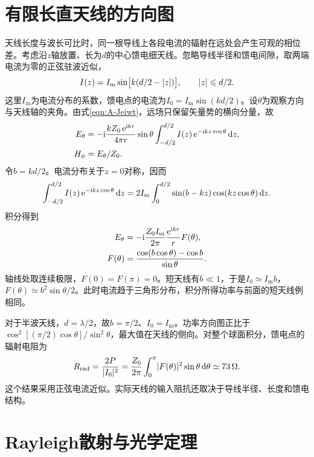 \section{有限长直天线的方向图}

天线长度与波长可比时，同一根导线上各段电流的辐射在远处会产生可观的相位差。考虑沿$z$轴放置、长为$d$的中心馈电细天线。忽略导线半径和馈电间隙，取两端电流为零的正弦驻波近似，
\[
    I(z) = I_{\mathrm{m}}\sin\bigl[k(d/2 - \lvert z\rvert)\bigr],\qquad
    \lvert z\rvert \leqslant d/2.
\]
这里$I_{\mathrm{m}}$为电流分布的系数，馈电点的电流为$I_0 = I_{\mathrm{m}}\sin(kd/2)$。设$\theta$为观察方向与天线轴的夹角。由式\eqref{eqn:A-Jeiwt}，远场只保留矢量势的横向分量，故
\begin{align*}
    E_\theta &= -\mathrm{i}\frac{kZ_0\mathop{}\!\mathrm{e}^{\mathrm{i} kr}}{4\pi r}\sin\theta
       \int_{-d/2}^{d/2} I(z)\mathop{}\!\mathrm{e}^{-\mathrm{i} kz\cos\theta}\mathop{}\!\mathrm{d} z,\\
    H_\phi &= E_\theta/Z_0.
\end{align*}
令$b = kd/2$。电流分布关于$z = 0$对称，因而
\[
    \int_{-d/2}^{d/2}I(z)\mathop{}\!\mathrm{e}^{-\mathrm{i} kz\cos\theta}\mathop{}\!\mathrm{d} z = 2I_{\mathrm{m}}\int_0^{d/2}\sin(b - kz)\cos(kz\cos\theta)\mathop{}\!\mathrm{d} z.
\]
积分得到
\begin{subequations}
    \begin{align}
        E_\theta &= -\mathrm{i}\frac{Z_0 I_{\mathrm{m}}}{2\pi}\frac{\mathop{}\!\mathrm{e}^{\mathrm{i} kr}}r F(\theta),\\
        F(\theta) &= \frac{\cos(b\cos\theta) - \cos b}{\sin\theta}.
    \end{align}
\end{subequations}
轴线处取连续极限，$F(0) = F(\pi) = 0$。短天线有$b \ll 1$，于是$I_0 \simeq I_{\mathrm{m}} b$，$F(\theta) \simeq b^2\sin\theta/2$。此时电流趋于三角形分布，积分所得功率与前面的短天线例相同。

对于半波天线，$d = \lambda/2$，故$b = \pi/2$、$I_0 = I_{\mathrm{m}}$。功率方向图正比于$\cos^2[(\pi/2)\cos\theta]/\sin^2\theta$，最大值在天线的侧向。对整个球面积分，馈电点的辐射电阻为
\begin{equation}
    \label{eq:ed-linear-antenna-resistance}
    R_\mathrm{rad} = \frac{2P}{\lvert I_0\rvert^2}
    = \frac{Z_0}{2\pi}\int_0^\pi\lvert F(\theta)\rvert^2\sin\theta\mathop{}\!\mathrm{d}\theta
    \simeq \qty{73}{\ohm}.
\end{equation}
这个结果采用正弦电流近似。实际天线的输入阻抗还取决于导线半径、长度和馈电结构。

\section{Rayleigh散射与光学定理}
\label{sec:Rayleigh cross sections}

